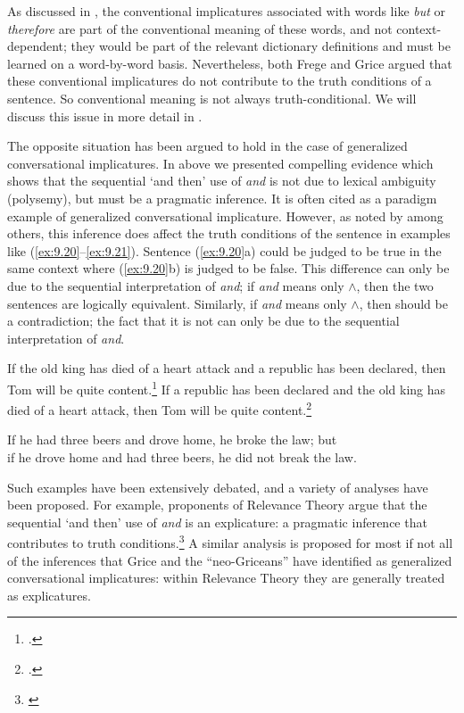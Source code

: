 As discussed in , the conventional implicatures associated with words like \textit{but} or \textit{therefore} are part of the conventional meaning of these words, and not context-dependent; they would be part of the relevant dictionary definitions and must be learned on a word-by-word basis. Nevertheless, both Frege and Grice argued that these conventional implicatures do not contribute to the truth conditions of a sentence. So conventional meaning is not always truth-conditional. We will discuss this issue in more detail in .



The opposite situation has been argued to hold in the case of generalized conversational implicatures. In  above we presented compelling evidence which shows that the sequential ‘and then’ use of \textit{and} is not due to lexical ambiguity (polysemy), but must be a pragmatic inference. It is often cited as a paradigm example of generalized conversational implicature. However, as noted by \citet{Levinson1995,Levinson2000} among others, this inference does affect the truth conditions of the sentence in examples like (\ref{ex:9.20}--\ref{ex:9.21}). Sentence (\ref{ex:9.20}a) could be judged to be true in the same context where (\ref{ex:9.20}b) is judged to be false. This difference can only be due to the sequential interpretation of \textit{and}; if \textit{and} means only $\wedge$, then the two sentences are logically equivalent. Similarly, if \textit{and} means only $\wedge$, then  should be a contradiction; the fact that it is not can only be due to the sequential interpretation of \textit{and}.


\ea \label{ex:9.20}
\ea  If the old king has died of a heart attack and a republic has been declared, then Tom will be quite content.\footnote{\citet[58]{Cohen1971}.}
\ex  If a republic has been declared and the old king has died of a heart attack, then Tom will be quite content.\footnote{\citet[69]{Gazdar1979}.}
\z \z

\ea \label{ex:9.21}
If he had three beers and drove home, he broke the law; but\\
if he drove home and had three beers, he did not break the law.
\z


Such examples have been extensively debated, and a variety of analyses have been proposed. For example, proponents of Relevance Theory argue that the sequential ‘and then’ use of \textit{and} is an explicature: a pragmatic inference that contributes to truth conditions.\footnote{\citet{Carston1988,Carston2004}} A similar analysis is proposed for most if not all of the inferences that Grice and the “neo-Griceans” have identified as generalized conversational implicatures: within Relevance Theory they are generally treated as explicatures.



